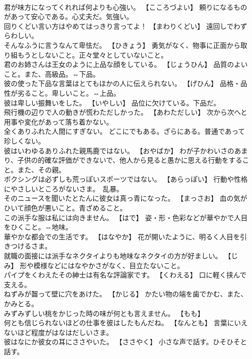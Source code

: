 \documentclass[8pt]{extreport}
\begin{document}
\begin{CJK}{UTF8}{min}
\\	君が味方になってくれれば何よりも心強い。	【こころづよい】 頼りになるものがあって安心である。心丈夫だ。気強い。
\\	回りくどい言い方はやめてはっきり言ってよ！	【まわりくどい】 遠回しでわずらわしい。
\\	そんなふうに言うなんて卑怯だ。	【ひきょう】 勇気がなく、物事に正面から取り組もうとしないこと。正々堂々としていないこと。
\\	君のお姉さんは王女のように上品な顔をしている。	【じょうひん】 品質のよいこと。また、高級品。⇔下品。
\\	彼の使った下品な言葉はとてもほかの人に伝えられない。	【げひん】 品格・品性が劣ること。卑しいこと。⇔上品。
\\	彼は卑しい振舞いをした。	【いやしい】 品位に欠けている。下品だ。
\\	飛行機の辺りで人の動きが慌わただしかった。	【あわただしい】 次から次へと用事や変化があって落ち着かない。
\\	全くありふれた人間にすぎない。	どこにでもある。ざらにある。普通であって珍しくない。
\\	彼はいわゆるありふれた親馬鹿ではない。	【おやばか】 わが子かわいさのあまり、子供の的確な評価ができないで、他人から見ると愚かに思える行動をすること。また、その親。
\\	ボクシングは必ずしも荒っぽいスポーツではない。	【あらっぽい】 行動や性格にやさしいところがないさま。　乱暴。
\\	そのニュースを聞いたとたんに彼女は真っ青になった。	【まっさお】 血の気がひいて顔色が悪いこと。青ざめること。
\\	この派手な服は私には向きません。	【はで】 姿・形・色彩などが華やかで人目をひくこと。⇔地味。
\\	華やかな都会での生活です。	【はなやか】 花が開いたように、明るく人目を引きつけるさま。
\\	就職の面接には派手なネクタイよりも地味なネクタイの方が好ましい。	【じみ】 形や模様などにはなやかさがなく、目立たないこと。
\\	パイプをくわえたその紳士は有名な評論家です。	【くわえる】 口に軽く挟んで支える。
\\	ねずみが齧って壁に穴をあけた。	【かじる】 かたい物の端を歯でかむ、また、かみとる。
\\	みずみずしい桃をかじった時の味が何とも言えません。	【もも】
\\	何とも信じられないほどの仕事を彼はしたもんだね。	【なんとも】 言葉にいえないほど程度がはなはだしいさま。
\\	彼はなにか彼女の耳にささやいた。	【ささやく】 小さな声で話す。ひそひそと話す。

\end{CJK}
\end{document}
